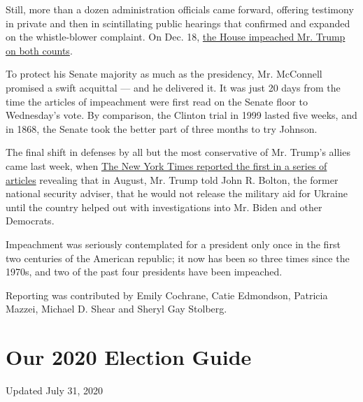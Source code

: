 Still, more than a dozen administration officials came forward, offering
testimony in private and then in scintillating public hearings that
confirmed and expanded on the whistle-blower complaint. On Dec. 18,
\href{https://www.nytimes.com/2019/12/18/us/politics/trump-impeached.html}{the
House impeached Mr. Trump on both counts}.

To protect his Senate majority as much as the presidency, Mr. McConnell
promised a swift acquittal --- and he delivered it. It was just 20 days
from the time the articles of impeachment were first read on the Senate
floor to Wednesday's vote. By comparison, the Clinton trial in 1999
lasted five weeks, and in 1868, the Senate took the better part of three
months to try Johnson.

The final shift in defenses by all but the most conservative of Mr.
Trump's allies came last week, when
\href{https://www.nytimes.com/2020/01/26/us/politics/trump-bolton-book-ukraine.html}{The
New York Times reported the first in a series of articles} revealing
that in August, Mr. Trump told John R. Bolton, the former national
security adviser, that he would not release the military aid for Ukraine
until the country helped out with investigations into Mr. Biden and
other Democrats.

Impeachment was seriously contemplated for a president only once in the
first two centuries of the American republic; it now has been so three
times since the 1970s, and two of the past four presidents have been
impeached.

Reporting was contributed by Emily Cochrane, Catie Edmondson, Patricia
Mazzei, Michael D. Shear and Sheryl Gay Stolberg.

\hypertarget{our-2020-election-guide}{%
\section{Our 2020 Election Guide}\label{our-2020-election-guide}}

Updated July 31, 2020

